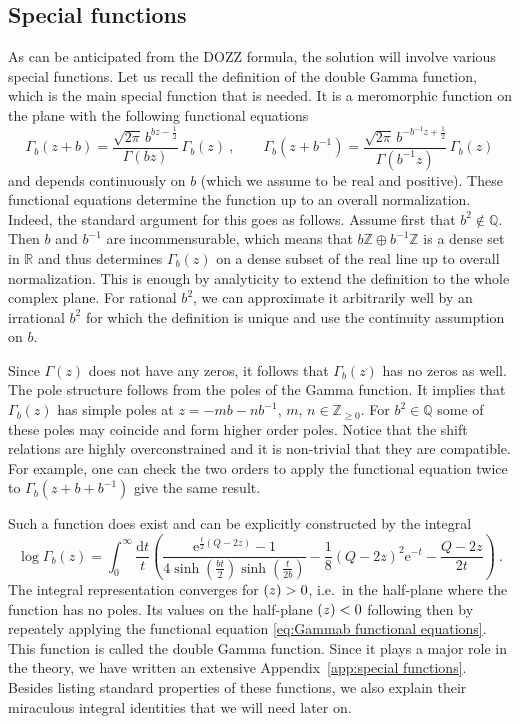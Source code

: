 \documentclass[12pt,a4paper]{article}
\newcommand{\be}{\begin{equation}}
\newcommand{\ee}{\end{equation}}
\newcommand\ZZ{\mathbb{Z}}
\newcommand\RR{\mathbb{R}}
\newcommand\QQ{\mathbb{Q}}
\let\Re\relax
\DeclareMathOperator\Re{Re}
\begin{document}
\subsection{Special functions} \label{subsec:special functions}
As can be anticipated from the DOZZ formula, the solution will involve various special functions. Let us recall the definition of the double Gamma function, which is the main special function that is needed. It is a meromorphic function on the plane with the following functional equations
\be  
\Gamma_b(z+b)=\frac{\sqrt{2\pi}\,  b^{bz-\frac{1}{2}}}{\Gamma(bz)}\, \Gamma_b(z)\ , \qquad \Gamma_b(z+b^{-1})=\frac{\sqrt{2\pi}\,  b^{-b^{-1}z+\frac{1}{2}}}{\Gamma(b^{-1}z)}\, \Gamma_b(z) \label{eq:Gammab functional equations}
\ee
and depends continuously on $b$ (which we assume to be real and positive).
These functional equations determine the function up to an overall normalization. Indeed, the standard argument for this goes as follows. Assume first that $b^2 \not \in \QQ$. Then $b$ and $b^{-1}$ are incommensurable, which means that $b \ZZ \oplus b^{-1} \ZZ$ is a dense set in $\RR$ and thus determines $\Gamma_b(z)$ on a dense subset of the real line up to overall normalization. This is enough by analyticity to extend the definition to the whole complex plane. For rational $b^2$, we can approximate it arbitrarily well by an irrational $b^2$ for which the definition is unique and use the continuity assumption on $b$.

Since $\Gamma(z)$ does not have any zeros, it follows that $\Gamma_b(z)$ has no zeros as well. The pole structure follows from the poles of the Gamma function. It implies that $\Gamma_b(z)$ has simple poles at $z=-m b-n b^{-1}$, $m,\, n \in \ZZ_{\ge 0}$. For $b^2 \in \QQ$ some of these poles may coincide and form higher order poles.
Notice that the shift relations are highly overconstrained and it is non-trivial that they are compatible. For example, one can check the two orders to apply the functional equation twice to $\Gamma_b(z+b+b^{-1})$ give the same result.

Such a function does exist and can be explicitly constructed by the integral 
\be  
\log \Gamma_b(z)=\int_0^\infty \frac{\mathrm{d}t}{t}\left(\frac{\mathrm{e}^{\frac{t}{2}(Q-2z)}-1}{4 \sinh(\frac{bt}{2})\sinh(\frac{t}{2b})}-\frac{1}{8}\left(Q-2z\right)^2 \mathrm{e}^{-t}-\frac{Q-2z}{2t}\right)\ . \label{eq:Gammab integral representation main text}
\ee
The integral representation converges for $\Re(z)>0$, i.e.\ in the half-plane where the function has no poles. Its values on the half-plane $\Re(z)<0$ following then by repeately applying the functional equation \eqref{eq:Gammab functional equations}.
This function is called the double Gamma function. Since it plays a major role in the theory, we have written an extensive Appendix~\ref{app:special functions}. Besides listing standard properties of these functions, we also explain their miraculous integral identities that we will need later on.
\end{document}
